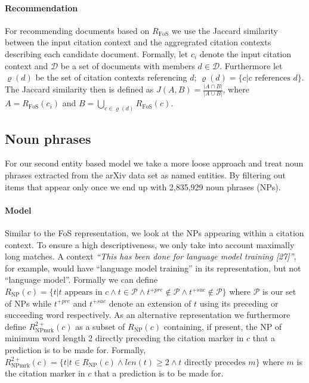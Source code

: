 \paragraph{Recommendation} For recommending documents based on $R_{\text{FoS}}$ we use the Jaccard similarity between the input citation context and the aggregrated citation contexts describing each candidate document. Formally, let $c_i$ denote the input citation context and $\mathcal{D}$ be a set of documents with members $d\in \mathcal{D}$. Furthermore let $\varrho(d)$ be the set of citation contexts referencing $d$; ${\varrho(d)=\{c|c\text{ references } d\}}$. The Jaccard similarity then is defined as ${J(A,B)=\frac{|A\cap B|}{|A\cup B|}}$, where $A = R_{\text{FoS}}(c_i)$ and $B=\bigcup\limits_{c \in \varrho(d)} R_{\text{FoS}}(c)$.

\subsection{Noun phrases}
For our second entity based model we take a more loose approach and treat noun phrases extracted from the arXiv data set as named entities. By filtering out items that appear only once we end up with 2,835,929 noun phrases (NPs).

\paragraph{Model} Similar to the FoS representation, we look at the NPs appearing within a citation context. To ensure a high descriptiveness, we only take into account maximally long matches. A context \emph{``This has been done for language model training [27]''}, for example, would have ``language model training'' in its representation, but not ``language model''. Formally we can define ${R_{\text{NP}}(c) = \{t|t\text{ appears in }c \land t\in \mathcal{P} \land t^{+pre} \notin \mathcal{P}\land t^{+suc} \notin \mathcal{P}\}}$ where $\mathcal{P}$ is our set of NPs while $t^{+pre}$ and $t^{+suc}$ denote an extension of $t$ using its preceding or succeeding word respectively. As an alternative representation we furthermore define ${R_{\text{NPmrk}}^{2+}(c)}$ as a subset of ${R_{\text{NP}}(c)}$ containing, if present, the NP of minimum word length 2 directly preceding the citation marker in $c$ that a prediction is to be made for. Formally, ${R_{\text{NPmrk}}^{2+}(c) = \{t|t\in R_{\text{NP}}(c)\land len(t)\geq 2 \land t\text{ directly precedes } m\}}$ where $m$ is the citation marker in $c$ that a prediction is to be made for.

